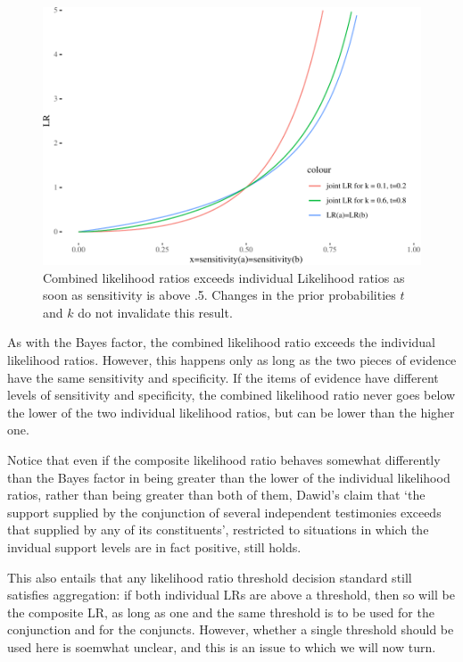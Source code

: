 \documentclass[
  10pt,
  dvipsnames,enabledeprecatedfontcommands]{scrartcl}
\begin{document}
\begin{figure}

\begin{center}\includegraphics[width=0.9\linewidth]{conjunction-paradox_files/figure-latex/unnamed-chunk-2-1} \end{center}

\caption{Combined likelihood ratios exceeds individual Likelihood ratios as soon as sensitivity is above .5. Changes in the prior 
probabilities $t$ and $k$ do not invalidate this result.}
\label{fig:jointLRMarcello}
\end{figure}

As with the Bayes factor, the combined likelihood ratio exceeds the
individual likelihood ratios. However, this happens only as long as the
two pieces of evidence have the same sensitivity and specificity. If the
items of evidence have different levels of sensitivity and specificity,
the combined likelihood ratio never goes below the lower of the two
individual likelihood ratios, but can be lower than the higher one.


Notice that even if the composite likelihood ratio behaves somewhat
differently than the Bayes factor in being greater than the lower of the
individual likelihood ratios, rather than being greater than both of
them, Dawid's claim that `the support supplied by the conjunction of
several independent testimonies exceeds that supplied by any of its
constituents', restricted to situations in which the invidual support
levels are in fact positive, still holds.

This also entails that any likelihood ratio threshold decision standard
still satisfies aggregation: if both individual LRs are above a
threshold, then so will be the composite LR, as long as one and the same
threshold is to be used for the conjunction and for the conjuncts.
However, whether a single threshold should be used here is soemwhat
unclear, and this is an issue to which we will now turn.
\end{document}
